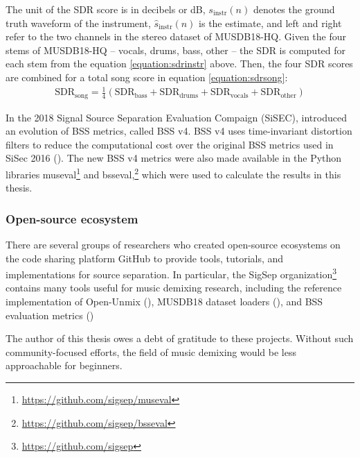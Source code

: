\documentclass[report.tex]{subfiles}
\begin{document}
The unit of the SDR score is in decibels or dB, $s_{\text{instr}}(n)$ denotes the ground truth waveform of the instrument, $\hat{s}_{\text{instr}}(n)$ is the estimate, and left and right refer to the two channels in the stereo dataset of MUSDB18-HQ. Given the four stems of MUSDB18-HQ -- vocals, drums, bass, other -- the SDR is computed for each stem from the equation \eqref{equation:sdrinstr} above. Then, the four SDR scores are combined for a total song score in equation \eqref{equation:sdrsong}:
\begin{align}
	\text{SDR}_{\text{song}} = \frac{1}{4}(\text{SDR}_{\text{bass}} + \text{SDR}_{\text{drums}} + \text{SDR}_{\text{vocals}} + \text{SDR}_{\text{other}}) \tag{11}\label{equation:sdrsong}
\end{align}

In the 2018 Signal Source Separation Evaluation Compaign (SiSEC), \textcite{sisec2018} introduced an evolution of BSS metrics, called BSS v4. BSS v4 uses time-invariant distortion filters to reduce the computational cost over the original BSS metrics used in SiSec 2016 (\cite{sisec2016}). The new BSS v4 metrics were also made available in the Python libraries museval\footnote{\url{https://github.com/sigsep/museval}} and bsseval,\footnote{\url{https://github.com/sigsep/bsseval}} which were used to calculate the results in this thesis.

\subsubsection{Open-source ecosystem}

There are several groups of researchers who created open-source ecosystems on the code sharing platform GitHub to provide tools, tutorials, and implementations for source separation. In particular, the SigSep organization\footnote{\url{https://github.com/sigsep}} contains many tools useful for music demixing research, including the reference implementation of Open-Unmix (\cite{umx}), MUSDB18 dataset loaders (\cite{musdb18, musdb18hq}), and BSS evaluation metrics (\cite{bss, sisec2018})

The author of this thesis owes a debt of gratitude to these projects. Without such community-focused efforts, the field of music demixing would be less approachable for beginners.
\end{document}
